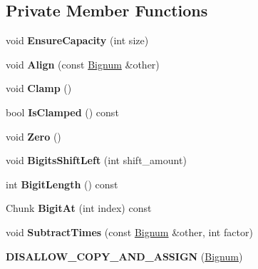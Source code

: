 \subsection*{Private Member Functions}
\begin{DoxyCompactItemize}
\item 
void {\bfseries Ensure\+Capacity} (int size)\hypertarget{classv8_1_1internal_1_1_bignum_afdee371a3c0c59b807a8127951c8d9fc}{}\label{classv8_1_1internal_1_1_bignum_afdee371a3c0c59b807a8127951c8d9fc}

\item 
void {\bfseries Align} (const \hyperlink{classv8_1_1internal_1_1_bignum}{Bignum} \&other)\hypertarget{classv8_1_1internal_1_1_bignum_a461387a708b930a7d74155aa85fccd75}{}\label{classv8_1_1internal_1_1_bignum_a461387a708b930a7d74155aa85fccd75}

\item 
void {\bfseries Clamp} ()\hypertarget{classv8_1_1internal_1_1_bignum_a869b5c0aae054085baf4edfe9bbc011b}{}\label{classv8_1_1internal_1_1_bignum_a869b5c0aae054085baf4edfe9bbc011b}

\item 
bool {\bfseries Is\+Clamped} () const \hypertarget{classv8_1_1internal_1_1_bignum_a9a048c78dbd926b510c43f557bb61000}{}\label{classv8_1_1internal_1_1_bignum_a9a048c78dbd926b510c43f557bb61000}

\item 
void {\bfseries Zero} ()\hypertarget{classv8_1_1internal_1_1_bignum_a309d6ec2eeafdf55306a98a57ac7f01a}{}\label{classv8_1_1internal_1_1_bignum_a309d6ec2eeafdf55306a98a57ac7f01a}

\item 
void {\bfseries Bigits\+Shift\+Left} (int shift\+\_\+amount)\hypertarget{classv8_1_1internal_1_1_bignum_a2b87f318f060081eb94af5a288de99de}{}\label{classv8_1_1internal_1_1_bignum_a2b87f318f060081eb94af5a288de99de}

\item 
int {\bfseries Bigit\+Length} () const \hypertarget{classv8_1_1internal_1_1_bignum_afd085b392aa516db1943a6f17543e0e6}{}\label{classv8_1_1internal_1_1_bignum_afd085b392aa516db1943a6f17543e0e6}

\item 
Chunk {\bfseries Bigit\+At} (int index) const \hypertarget{classv8_1_1internal_1_1_bignum_a6c74630b32c4e54889dd7134a1472345}{}\label{classv8_1_1internal_1_1_bignum_a6c74630b32c4e54889dd7134a1472345}

\item 
void {\bfseries Subtract\+Times} (const \hyperlink{classv8_1_1internal_1_1_bignum}{Bignum} \&other, int factor)\hypertarget{classv8_1_1internal_1_1_bignum_aa2af907330e50824ae4277189f3f2e28}{}\label{classv8_1_1internal_1_1_bignum_aa2af907330e50824ae4277189f3f2e28}

\item 
{\bfseries D\+I\+S\+A\+L\+L\+O\+W\+\_\+\+C\+O\+P\+Y\+\_\+\+A\+N\+D\+\_\+\+A\+S\+S\+I\+GN} (\hyperlink{classv8_1_1internal_1_1_bignum}{Bignum})\hypertarget{classv8_1_1internal_1_1_bignum_a0e4cc0ca9d616a3d4ef29b6e9c598e9b}{}\label{classv8_1_1internal_1_1_bignum_a0e4cc0ca9d616a3d4ef29b6e9c598e9b}

\end{DoxyCompactItemize}
